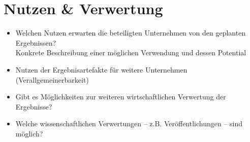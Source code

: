 \section{Nutzen \& Verwertung}
\label{sec:Nutzen}
\begin{itemize}
  \item	Welchen Nutzen erwarten die beteiligten Unternehmen von den geplanten Ergebnissen?\\Konkrete Beschreibung einer möglichen Verwendung und dessen Potential
  \item	Nutzen der Ergebnisartefakte für weitere Unternehmen (Verallgemeinerbarkeit)
  \item	Gibt es Möglichkeiten zur weiteren wirtschaftlichen Verwertung der Ergebnisse?
  \item	Welche wissenschaftlichen Verwertungen – z.B. Veröffentlichungen – sind möglich?
\end{itemize}
